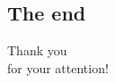 % 

\subsection{The end}
\begin{frame}{}
  \begin{center}
    \textcolor{kit-green100}{\Huge Thank you\\for your attention!\vspace{1em}}

  \end{center}
\end{frame}
